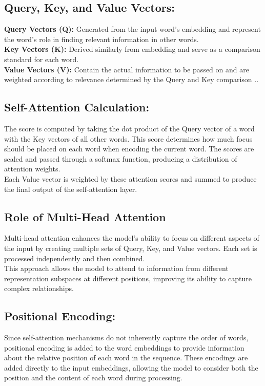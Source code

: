 \subsection{Query, Key, and Value Vectors:}
\textbf{Query Vectors (Q):} Generated from the input word's embedding and represent the word's role in finding relevant information in other words.\\
\textbf{Key Vectors (K):} Derived similarly from embedding and serve as a comparison standard for each word.\\
\textbf{Value Vectors (V):} Contain the actual information to be passed on and are weighted according to relevance determined by the Query and Key comparison \cite{vaswani2017attention}.. 
\subsection{Self-Attention Calculation:}
The score is computed by taking the dot product of the Query vector of a word with the Key vectors of all other words. This score determines how much focus should be placed on each word when encoding the current word.
The scores are scaled and passed through a softmax function, producing a distribution of attention weights. \\
Each Value vector is weighted by these attention scores and summed to produce the final output of the self-attention layer\cite{vaswani2017attention}.
\subsection{Role of Multi-Head Attention}
Multi-head attention enhances the model’s ability to focus on different aspects of the input by creating multiple sets of Query, Key, and Value vectors. Each set is processed independently and then combined. \\
This approach allows the model to attend to information from different representation subspaces at different positions, improving its ability to capture complex relationships\cite{vaswani2017attention}.
\subsection{Positional Encoding:}
Since self-attention mechanisms do not inherently capture the order of words, positional encoding is added to the word embeddings to provide information about the relative position of each word in the sequence.
These encodings are added directly to the input embeddings, allowing the model to consider both the position and the content of 
each word during processing\cite{alammar2018illustratedtransformer}.
